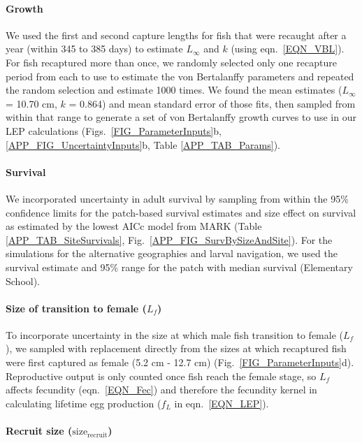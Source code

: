 \documentclass[12pt, oneside]{article}   	%
\begin{document}
\paragraph{Growth} \label{APP_SEC_Uncertainty_Growth}

We used the first and second capture lengths for fish that were recaught after a year (within 345 to 385 days) to estimate $L_\infty$ and $k$ (using eqn.\ \ref{EQN_VBL}). For fish recaptured more than once, we randomly selected only one recapture period from each to use to estimate the von Bertalanffy parameters and repeated the random selection and estimate 1000 times. We found the mean estimates ($L_\infty$ = 10.70 cm, $k$ = 0.864) and mean standard error of those fits, then sampled from within that range to generate a set of von Bertalanffy growth curves to use in our LEP calculations (Figs.\ \ref{FIG_ParameterInputs}b, \ref{APP_FIG_UncertaintyInputs}b,  Table \ref{APP_TAB_Params}).

\paragraph{Survival} \label{APP_SEC_Uncertainty_Survival}

We incorporated uncertainty in adult survival by sampling from within the 95\% confidence limits for the patch-based survival estimates and size effect on survival as estimated by the lowest AICc model from MARK (Table \ref{APP_TAB_SiteSurvivals}, Fig.\ \ref{APP_FIG_SurvBySizeAndSite}). For the simulations for the alternative geographies and larval navigation, we used the survival estimate and 95\% range for the patch with median survival (Elementary School).

\paragraph{Size of transition to female ($L_f$)} \label{APP_SEC_Uncertainty_FemaleSize}

To incorporate uncertainty in the size at which male fish transition to female ($L_f$), we sampled with replacement directly from the sizes at which recaptured fish were first captured as female (5.2 cm - 12.7 cm) (Fig.\ \ref{FIG_ParameterInputs}d). Reproductive output is only counted once fish reach the female stage, so $L_f$ affects fecundity (eqn.\ \ref{EQN_Fec}) and therefore the fecundity kernel in calculating lifetime egg production ($f_L$ in eqn.\ \ref{EQN_LEP}).

\paragraph{Recruit size ($\text{size}_\text{recruit}$)} \label{APP_SEC_Uncertainty_RecruitSize}
\end{document}
